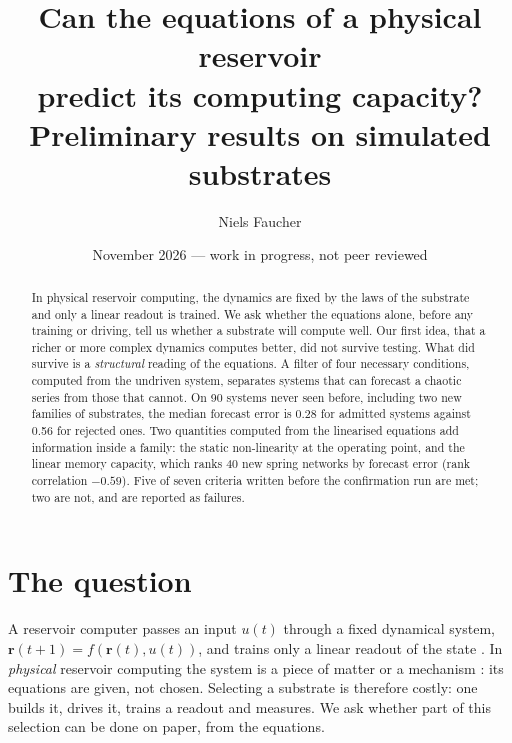 \documentclass[10pt,a4paper]{article}
\title{\textbf{Can the equations of a physical reservoir\\ predict its computing capacity?}\\[4pt]
\large Preliminary results on simulated substrates}
\author{Niels Faucher}
\date{November 2026 --- work in progress, not peer reviewed}
\begin{document}
\maketitle

\begin{center}
\end{center}

\begin{abstract}
\noindent In physical reservoir computing, the dynamics are fixed by the laws of the substrate
and only a linear readout is trained. We ask whether the equations alone, before any training
or driving, tell us whether a substrate will compute well. Our first idea, that a richer or
more complex dynamics computes better, did not survive testing. What did survive is a
\emph{structural} reading of the equations. A filter of four necessary conditions, computed
from the undriven system, separates systems that can forecast a chaotic series from those
that cannot. On 90 systems never seen before, including two new families of substrates, the
median forecast error is 0.28 for admitted systems against 0.56 for rejected ones. Two
quantities computed from the linearised equations add information inside a family: the static
non-linearity at the operating point, and the linear memory capacity, which ranks 40 new
spring networks by forecast error (rank correlation $-0.59$). Five of seven criteria written
before the confirmation run are met; two are not, and are reported as failures.
\end{abstract}

\section{The question}

A reservoir computer passes an input $u(t)$ through a fixed dynamical system,
$\mathbf r(t+1) = f(\mathbf r(t), u(t))$, and trains only a linear readout of the state
\cite{jaeger2001,maass2002,lukosevicius2009}. In \emph{physical} reservoir computing the
system is a piece of matter or a mechanism \cite{tanaka2019}: its equations are given, not
chosen. Selecting a substrate is therefore costly: one builds it, drives it, trains a readout
and measures. We ask whether part of this selection can be done on paper, from the equations.
\end{document}
